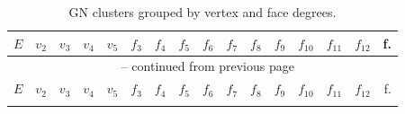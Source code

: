 \begin{appendix}
\footnotesize{\begin{longtable}{lrrrrrrrrrrrrrrr}
    \caption{\acs{GN} clusters grouped by vertex and face degrees.}
    \label{tab:verticesandfaces}\\
\toprule    
    $E$ & $v_2$ & $v_3$ & $v_4$ & $v_5$ & $f_3$ & $f_4$ & $f_5$ & $f_6$ & $f_7$ & $f_8$ & $f_9$ & $f_{10}$ & $f_{11}$ & $f_{12}$ & f. \\\midrule
\endfirsthead

\multicolumn{16}{c}{\tablename~\thetable{} -- continued from previous page}\\
\toprule
    $E$ & $v_2$ & $v_3$ & $v_4$ & $v_5$ & $f_3$ & $f_4$ & $f_5$ & $f_6$ & $f_7$ & $f_8$ & $f_9$ & $f_{10}$ & $f_{11}$ & $f_{12}$ & f. \\\midrule
\endhead

\bottomrule\endfoot


\end{longtable}}
\end{appendix}
